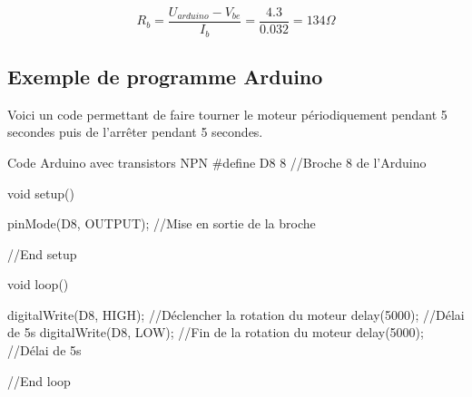     $$ \boxed{ R_{b} = \frac{U_{arduino}-V_{be}}{I_b} = \frac{4.3}{0.032} = 134 \Omega} $$

    \subsection{Exemple de programme Arduino}

    Voici un code permettant de faire tourner le moteur périodiquement pendant 5 secondes puis de l'arrêter pendant 5 secondes.

\begin{Cpp}{Code Arduino avec transistors NPN}
#define D8 8     //Broche 8 de l'Arduino

void setup() {

  pinMode(D8, OUTPUT); //Mise en sortie de la broche

}//End setup

void loop() {

  digitalWrite(D8, HIGH);     //Déclencher la rotation du moteur
  delay(5000);                //Délai de 5s
  digitalWrite(D8, LOW);      //Fin de la rotation du moteur
  delay(5000);                //Délai de 5s

}//End loop

\end{Cpp}
